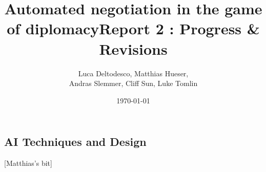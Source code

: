 \documentclass[english]{article}
\begin{document}
\title{Automated negotiation in the game of diplomacy}


\title{Report 2 : Progress \& Revisions}


\author{Luca Deltodesco, Matthias Hueser, \\
Andras Slemmer, Cliff Sun, Luke Tomlin}


\date{\today}

\maketitle



\subsection{AI Techniques and Design}

{[}Matthias's bit{]}
\end{document}
